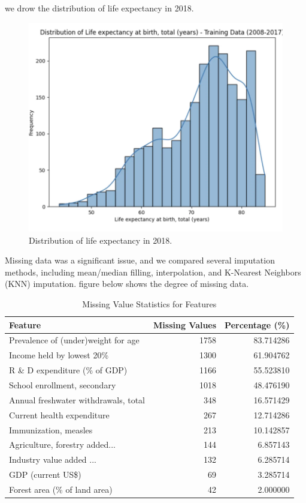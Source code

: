 \documentclass{article}
\begin{document}
we drow the distribution of life expectancy in 2018.
\begin{figure}[h]
    \centering
    \includegraphics[width=0.8\columnwidth]{./pic/T1.a.3.png} %
    \caption{Distribution of life expectancy in 2018.}
    \label{fig:life_expectancy_distribution}
\end{figure}
Missing data was a significant issue, and we compared several imputation methods, including mean/median filling, interpolation, and K-Nearest Neighbors (KNN) imputation.
figure below shows the degree of missing data. 
\begin{table}[h]
    \centering
    \caption{Missing Value Statistics for Features}
    \label{tab:missing_values}
    \begin{tabularx}{\columnwidth}{|>{\raggedright\arraybackslash}X|r|r|} %
        \hline
        \textbf{Feature} & \textbf{Missing Values} & \textbf{Percentage (\%)} \\
        \hline
        Prevalence of (under)weight for age & 1758 & 83.714286 \\
        Income held by lowest 20\% & 1300 & 61.904762 \\
        R \& D expenditure (\% of GDP) & 1166 & 55.523810 \\
        School enrollment, secondary  & 1018 & 48.476190 \\
        Annual freshwater withdrawals, total  & 348 & 16.571429 \\
        Current health expenditure  & 267 & 12.714286 \\
        Immunization, measles  & 213 & 10.142857 \\
        Agriculture, forestry added... & 144 & 6.857143 \\
        Industry value added ... & 132 & 6.285714 \\
        GDP (current US\$) & 69 & 3.285714 \\
        Forest area (\% of land area) & 42 & 2.000000 \\
        \hline
    \end{tabularx} %
\end{table}
\end{document}
